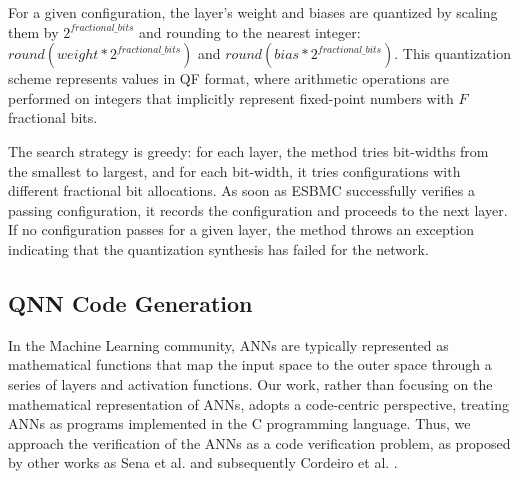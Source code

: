 For a given configuration, the layer's weight and biases are quantized by scaling them by $2^{fractional\_bits}$ and rounding to the nearest integer: $round(weight * 2^{fractional\_bits})$ and $round(bias * 2^{fractional\_bits})$. This quantization scheme represents values in QF format, where arithmetic operations are performed on integers that implicitly represent fixed-point numbers with $F$ fractional bits. 

The search strategy is greedy: for each layer, the method tries bit-widths from the smallest to largest, and for each bit-width, it tries configurations with different fractional bit allocations. As soon as ESBMC successfully verifies a passing configuration, it records the configuration and proceeds to the next layer. If no configuration passes for a given layer, the method throws an exception indicating that the quantization synthesis has failed for the network.

\subsection{QNN Code Generation}

In the Machine Learning community, ANNs are typically represented as mathematical functions that map the input space to the outer space through a series of layers and activation functions. Our work, rather than focusing on the mathematical representation of ANNs, adopts a code-centric perspective, treating ANNs as programs implemented in the C programming language. Thus, we approach the verification of the ANNs as a code verification problem, as proposed by other works as Sena et al. \cite{abdi2021counterexample} and subsequently Cordeiro et al. \cite{cordeiro2025neuralnetworkverificationprogramming}.

